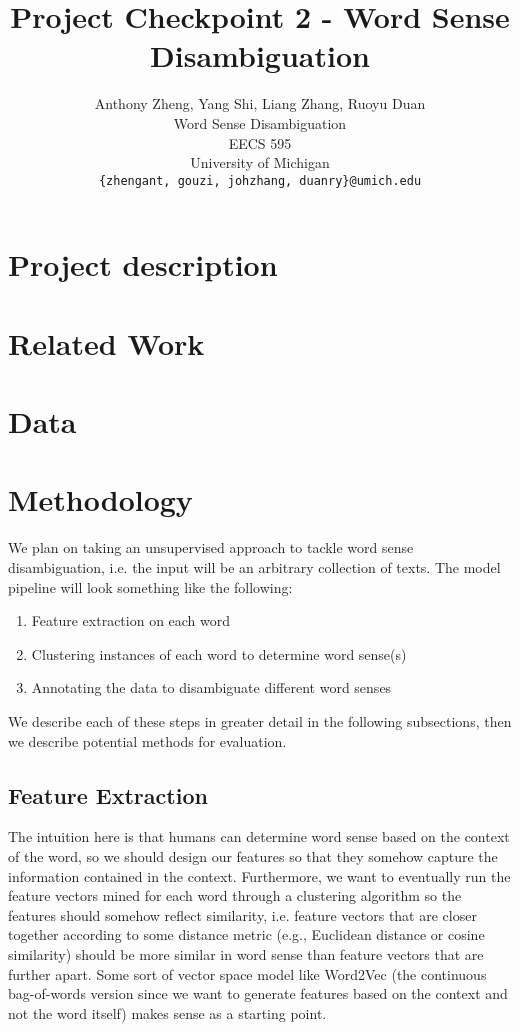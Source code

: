 \documentclass[11pt,letterpaper]{article}
\title{Project Checkpoint 2 - Word Sense Disambiguation}
\author{Anthony Zheng, Yang Shi, Liang Zhang, Ruoyu Duan\\
      Word Sense Disambiguation\\
      EECS 595\\
	    University of Michigan\\
	    {\tt \{zhengant, gouzi, johzhang, duanry\}@umich.edu}
}
\date{}
\begin{document}
\maketitle

\section{Project description}
\section{Related Work}
\section{Data}
\section{Methodology}
We plan on taking an unsupervised approach to tackle word sense disambiguation, i.e. the input will be an arbitrary collection of texts. The model pipeline will look something like the following:
\begin{enumerate}
  \item Feature extraction on each word
  \item Clustering instances of each word to determine word sense(s)
  \item Annotating the data to disambiguate different word senses
\end{enumerate}

We describe each of these steps in greater detail in the following subsections, then we describe potential methods for evaluation.

\subsection{Feature Extraction}
The intuition here is that humans can determine word sense based on the context of the word, so we should design our features so that they somehow capture the information contained in the context. Furthermore, we want to eventually run the feature vectors mined for each word through a clustering algorithm so the features should somehow reflect similarity, i.e. feature vectors that are closer together according to some distance metric (e.g., Euclidean distance or cosine similarity) should be more similar in word sense than feature vectors that are further apart. Some sort of vector space model like Word2Vec (the continuous bag-of-words version since we want to generate features based on the context and not the word itself) makes sense as a starting point. 
\end{document}
